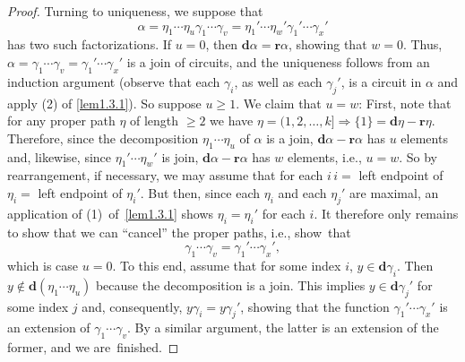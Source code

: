 \documentclass{surv-l}
\numberwithin{equation}{section}
\numberwithin{table}{section}
\numberwithin{figure}{section}
\theoremstyle{plain}
\theoremstyle{definition}
\begin{document}
\begin{proof}
Turning to uniqueness, we suppose that
\[
\alpha=\eta_{1}\cdots\eta_{u}\gamma_{1}\cdots\gamma_{v}
=\eta_{1}'\cdots\eta_{w}'\gamma_{1}'\cdots\gamma_{x}'
\]
has two such factorizations. If $u=0$, then
$\mathbf{d}\alpha=\mathbf{r}\alpha$, showing that $w=0$. Thus,
$\alpha=\gamma_{1}\cdots\gamma_{v}=\gamma_{1}'\cdots\gamma_{x}'$
is a join of circuits, and the uniqueness follows from an
induction argument (observe that each $\gamma_{i}$, as well as
each $\gamma_{j}'$, is a circuit in $\alpha$ and apply (2) of
\ref{lem1.3.1}). So suppose $u\geq 1$. We claim that $u=w$: First,
note that for any proper path $\eta$ of length $\geq 2$ we have
$\eta=(1,2,\ldots,
k]\Rightarrow\{1\}=\mathbf{d}\eta-\mathbf{r}\eta$. Therefore,
since the decomposition $\eta_{1}\cdots\eta_{u}$ of $\alpha$ is a
join, $\mathbf{d}\alpha-\mathbf{r}\alpha$ has $u$ elements and,
likewise, since $\eta_{1}'\cdots\eta_{w}'$ is join,
$\mathbf{d}\alpha-\mathbf{r}\alpha$ has $w$ elements, i.e., $u=w$.
So by rearrangement, if necessary, we may assume that for each
$i\,i=$ left endpoint of $\eta_{i}=$ left endpoint of $\eta_{i}'$.
But then, since each $\eta_{i}$ and each $\eta_{j}'$ are maximal,
an application of (1)~of~\ref{lem1.3.1} shows $\eta_{i}=\eta_{i}'$
for each $i$. It therefore only remains to show that we can
``cancel'' the proper paths, i.e., show~that
\[
\gamma_{1}\cdots\gamma_{v}=\gamma_{1}'\cdots\gamma_{x}',
\]
which is case $u=0$. To this end, assume that for some index
$i$, $y\in \mathbf{d}\gamma_{i}$. Then $y\not\in
\mathbf{d}(\eta_{1}\cdots\eta_{u})$ because the decomposition
is a join. This implies $y\in \mathbf{d}\gamma_{j}'$ for some
index $j$ and, consequently, $y\gamma_{i}=y\gamma_{j}'$,
showing that the function $\gamma_{1}'\cdots\gamma_{x}'$ is an
extension of $\gamma_{1}\cdots\gamma_{v}$. By a similar
argument, the latter is an extension of the former, and we
are~finished.
\end{proof}
\end{document}
